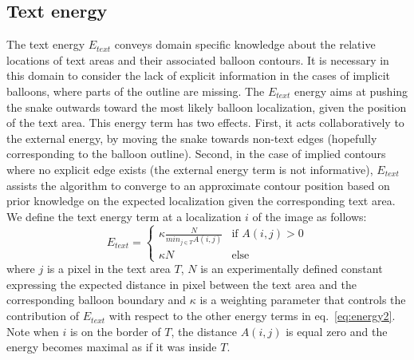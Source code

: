 \documentclass[conference]{IEEEtran}
\begin{document}


\subsection{Text energy}
\label{sec:text_energie}
The text energy $E_{text}$ conveys domain specific knowledge about the relative locations of text areas and their associated balloon contours. It is necessary in this domain to consider the lack of explicit information in the cases of implicit balloons, where parts of the outline are missing.
The $E_{text}$ energy aims at pushing the snake outwards toward the most likely balloon localization, given the position of the text area. This energy term has two effects. First, it acts collaboratively to the external energy, by moving the snake towards non-text edges (hopefully corresponding to the balloon outline). Second, in the case of implied contours where no explicit edge exists (the external energy term is not informative), $E_{text}$ assists the algorithm to converge to an approximate contour position based on prior knowledge on the expected localization given the corresponding text area.
We define the text energy term at a localization $i$ of the image as follows:
\begin{equation}\label{eq:know}
E_{text} = \begin{cases} \kappa \frac{N}{min_{j \in T} A(i,j)} & \mbox{if } A(i,j) > 0 \\ \kappa N & \mbox{else} \end{cases}
\end{equation}
where $j$ is a pixel in the text area $T$, $N$ is an experimentally defined constant expressing the expected distance in pixel between the text area and the corresponding balloon boundary and $\kappa$ is a weighting parameter that controls the contribution of $E_{text}$ with respect to the other energy terms in eq.~\ref{eq:energy2}. Note when $i$ is on the border of $T$, the distance $A(i,j)$ is equal zero and the energy becomes maximal as if it was inside $T$.
\end{document}

